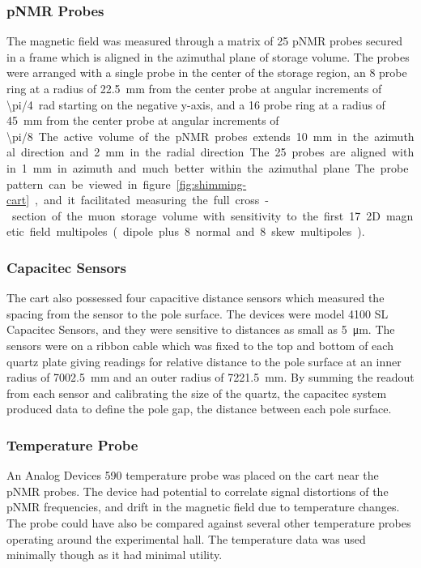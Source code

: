 \subsubsection{pNMR Probes}
The magnetic field was measured through a matrix of 25 pNMR probes secured in a frame which is aligned in the azimuthal plane of storage volume.  The probes were arranged with a single probe in the center of the storage region, an 8 probe ring at a radius of \SI{22.5}{\mm} from the center probe at angular increments of \SI{\pi/4}{\radian} starting on the negative y-axis, and a 16 probe ring at a radius of \SI{45}{\mm} from the center probe at angular increments of \SI{\pi/8}.  The active volume of the pNMR probes extends \SI{10}{\mm} in the azimuthal direction and \SI{2}{\mm} in the radial direction.  The 25 probes are aligned within \SI{1}{\mm} in azimuth and much better within the azimuthal plane.  The probe pattern can be viewed in figure \ref{fig:shimming-cart}, and it facilitated measuring the full cross-section of the muon storage volume with sensitivity to the first 17 2D magnetic field multipoles (dipole plus 8 normal and 8 skew multipoles).

\subsubsection{Capacitec Sensors}
The cart also possessed four capacitive distance sensors which measured the spacing from the sensor to the pole surface.  The devices were model 4100 SL Capacitec Sensors, and they were sensitive to distances as small as \SI{5}{\micro \meter}.   The sensors were on a ribbon cable which was fixed to the top and bottom of each quartz plate giving readings for relative distance to the pole surface at an inner radius of \SI{7002.5}{\mm} and an outer radius of \SI{7221.5}{\mm}.  By summing the readout from each sensor and calibrating the size of the quartz, the capacitec system produced data to define the pole gap, the distance between each pole surface.

\subsubsection{Temperature Probe}
An Analog Devices 590 temperature probe was placed on the cart near the pNMR probes. The device had potential to correlate signal distortions of the pNMR frequencies, and drift in the magnetic field due to temperature changes.  The probe could have also be compared against several other temperature probes operating around the experimental hall.  The temperature data was used minimally though as it had minimal utility.


